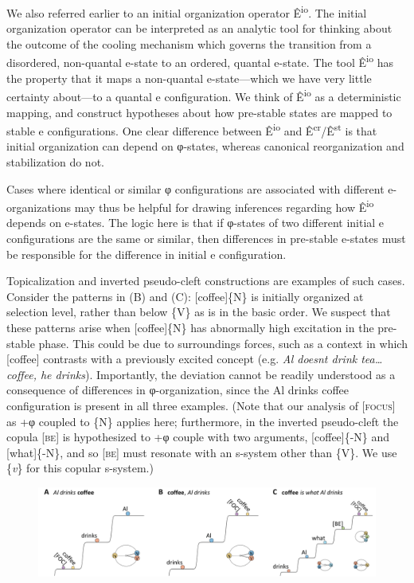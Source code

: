   We also referred earlier to an initial organization operator Ê\textsuperscript{io}. The initial organization operator can be interpreted as an analytic tool for thinking about the outcome of the cooling mechanism which governs the transition from a disordered, non-quantal e-state to an ordered, quantal e-state. The tool Ê\textsuperscript{io} has the property that it maps a non-quantal e-state—which we have very little certainty about—to a quantal e configuration. We think of Ê\textsuperscript{io} as a deterministic mapping, and construct hypotheses about how pre-stable states are mapped to stable e configurations. One clear difference between Ê\textsuperscript{io} and Ê\textsuperscript{cr}/Ê\textsuperscript{st} is that initial organization can depend on φ-states, whereas canonical reorganization and stabilization do not. 

  Cases where identical or similar φ configurations are associated with different e-organizations may thus be helpful for drawing inferences regarding how Ê\textsuperscript{io} depends on e-states. The logic here is that if φ-states of two different initial e configurations are the same or similar, then differences in pre-stable e-states must be responsible for the difference in initial e configuration. 

  Topicalization and inverted pseudo-cleft constructions are examples of such cases. Consider the patterns in (B) and (C): [coffee]\{N\} is initially organized at selection level, rather than below \{V\} as is in the basic order. We suspect that these patterns arise when [coffee]\{N\} has abnormally high excitation in the pre-stable phase. This could be due to surroundings forces, such as a context in which [coffee] contrasts with a previously excited concept (e.g. \textit{Al doesnt drink tea…coffee, he drinks}). Importantly, the deviation cannot be readily understood as a consequence of differences in φ-organization, since the {\textbar}Al drinks coffee{\textbar} configuration is present in all three examples. (Note that our analysis of [\textsc{focus}] as +φ coupled to \{N\} applies here; furthermore, in the inverted pseudo-cleft the copula [\textsc{be}] is hypothesized to +φ couple with two arguments, [coffee]\{-N\} and [what]\{-N\}, and so [\textsc{be}] must resonate with an s-system other than \{V\}. We use \{\textit{v}\} for this copular s-system.)

  
\begin{figure}
\includegraphics[width=\textwidth]{figures/Tilsen-img78.png}
\caption{\missingcaption}
\label{fig:4:28}
\end{figure}
 

